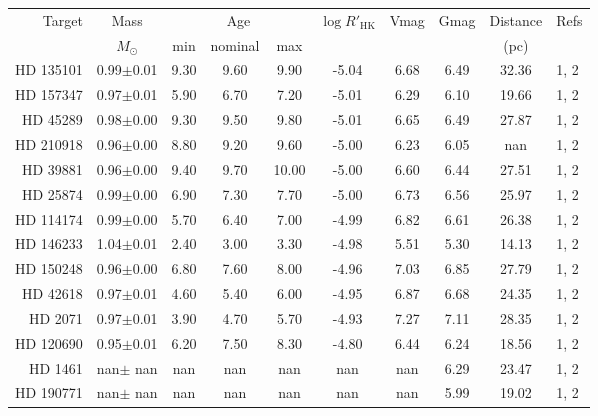 
\begin{table*}
  \centering
  \begin{tabular}{rccccccccl}
    \hline
    \hline
    Target & Mass      & \multicolumn{3}{c}{Age} & $\log R'_{\mathrm{HK}}$ & Vmag & Gmag &  Distance & Refs\\
           & $M_\odot$ & min & nominal & max     &                       &      &      & (pc) & \\ 
    \hline       
HD 135101 & 0.99$\pm$0.01 & 9.30 & 9.60 & 9.90 & -5.04 & 6.68 & 6.49 & 32.36 & 1, 2 \\ 
HD 157347 & 0.97$\pm$0.01 & 5.90 & 6.70 & 7.20 & -5.01 & 6.29 & 6.10 & 19.66 & 1, 2 \\ 
HD 45289 & 0.98$\pm$0.00 & 9.30 & 9.50 & 9.80 & -5.01 & 6.65 & 6.49 & 27.87 & 1, 2 \\ 
HD 210918 & 0.96$\pm$0.00 & 8.80 & 9.20 & 9.60 & -5.00 & 6.23 & 6.05 &  nan & 1, 2 \\ 
HD 39881 & 0.96$\pm$0.00 & 9.40 & 9.70 & 10.00 & -5.00 & 6.60 & 6.44 & 27.51 & 1, 2 \\ 
HD 25874 & 0.99$\pm$0.00 & 6.90 & 7.30 & 7.70 & -5.00 & 6.73 & 6.56 & 25.97 & 1, 2 \\ 
HD 114174 & 0.99$\pm$0.00 & 5.70 & 6.40 & 7.00 & -4.99 & 6.82 & 6.61 & 26.38 & 1, 2 \\ 
HD 146233 & 1.04$\pm$0.01 & 2.40 & 3.00 & 3.30 & -4.98 & 5.51 & 5.30 & 14.13 & 1, 2 \\ 
HD 150248 & 0.96$\pm$0.00 & 6.80 & 7.60 & 8.00 & -4.96 & 7.03 & 6.85 & 27.79 & 1, 2 \\ 
HD 42618 & 0.97$\pm$0.01 & 4.60 & 5.40 & 6.00 & -4.95 & 6.87 & 6.68 & 24.35 & 1, 2 \\ 
HD 2071 & 0.97$\pm$0.01 & 3.90 & 4.70 & 5.70 & -4.93 & 7.27 & 7.11 & 28.35 & 1, 2 \\ 
HD 120690 & 0.95$\pm$0.01 & 6.20 & 7.50 & 8.30 & -4.80 & 6.44 & 6.24 & 18.56 & 1, 2 \\ 
HD 1461 &  nan$\pm$ nan &  nan &  nan &  nan &  nan &  nan & 6.29 & 23.47 & 1, 2 \\ 
HD 190771 &  nan$\pm$ nan &  nan &  nan &  nan &  nan &  nan & 5.99 & 19.02 & 1, 2 \\ 

    \hline
  \end{tabular}
  
\end{table*}
